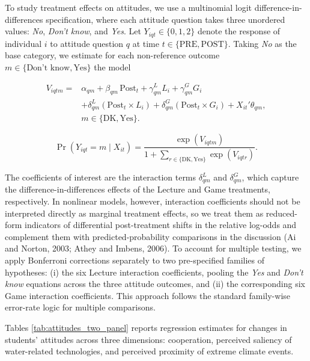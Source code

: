 \documentclass[preprint,12pt]{elsarticle}
\begin{document}
To study treatment effects on attitudes, we use a multinomial logit difference-in-differences specification, where each attitude question takes three unordered values: \textit{No}, \textit{Don't know}, and \textit{Yes}. Let $Y_{iqt} \in \{0,1,2\}$ denote the response of individual $i$ to attitude question $q$ at time $t \in \{\text{PRE},\text{POST}\}$. Taking \textit{No} as the base category, we estimate for each non-reference outcome $m \in \{\text{Don't know}, \text{Yes}\}$ the model

\begin{equation}
\begin{aligned}
V_{iqtm}={}&
\alpha_{qm}
+\beta_{qm}\,\text{Post}_t
+\gamma_{qm}^{L}L_i
+\gamma_{qm}^{G}G_i \\
&+\delta_{qm}^{L}(\text{Post}_t\times L_i)
+\delta_{qm}^{G}(\text{Post}_t\times G_i)
+X_{it}'\theta_{qm}, \\
& m\in\{\text{DK},\text{Yes}\}.
\end{aligned}
\end{equation}

\begin{equation}
\Pr(Y_{iqt}=m\mid X_{it})
=
\frac{\exp(V_{iqtm})}
{1+\sum_{r\in\{\text{DK},\text{Yes}\}}\exp(V_{iqtr})}.
\end{equation}

The coefficients of interest are the interaction terms $\delta_{qm}^{L}$ and $\delta_{qm}^{G}$, which capture the difference-in-differences effects of the Lecture and Game treatments, respectively. In nonlinear models, however, interaction coefficients should not be interpreted directly as marginal treatment effects, so we treat them as reduced-form indicators of differential post-treatment shifts in the relative log-odds and complement them with predicted-probability comparisons in the discussion (Ai and Norton, 2003; Athey and Imbens, 2006). To account for multiple testing, we apply Bonferroni corrections separately to two pre-specified families of hypotheses: (i) the six Lecture interaction coefficients, pooling the \textit{Yes} and \textit{Don't know} equations across the three attitude outcomes, and (ii) the corresponding six Game interaction coefficients. This approach follows the standard family-wise error-rate logic for multiple comparisons. 


Tables \ref{tab:attitudes_two_panel} reports regression estimates for changes in students’ attitudes across three dimensions: cooperation, perceived saliency of water-related technologies, and perceived proximity of extreme climate events.
\end{document}
